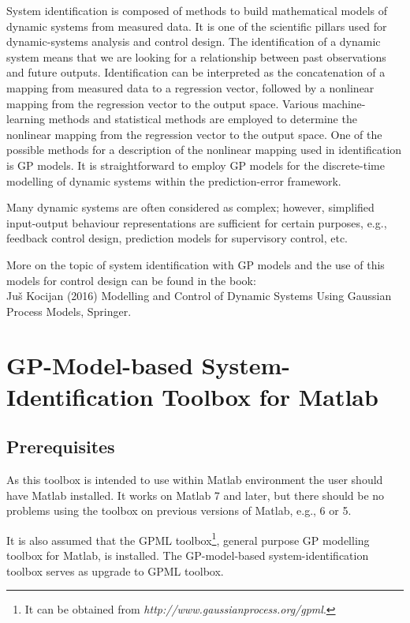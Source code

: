 \documentclass[12pt,twoside]{article}
\begin{document}
System identification is composed of methods to build mathematical models of dynamic systems from measured data. It is one of the scientific pillars used for dynamic-systems analysis and control design. The identification of a dynamic system means that we are looking for a relationship between past observations and future outputs. Identification can be interpreted as the concatenation of a mapping from measured data to a regression vector, followed by a nonlinear mapping from the regression vector to the output space. Various machine-learning methods and statistical methods are employed to determine the nonlinear mapping from the regression vector
to the output space. One of the possible methods for a description of the nonlinear mapping used in identification is GP models. It is straightforward to employ GP models for the discrete-time modelling of dynamic systems within the prediction-error framework.

Many dynamic systems are often considered as complex; however, simplified
input-output behaviour representations are sufficient for certain purposes,
e.g., feedback control design, prediction models for supervisory control,
etc.

More on the topic of system identification with GP models and the use of this models for control design can be found in the book:\\
Ju\v s Kocijan (2016) Modelling and Control of Dynamic Systems Using Gaussian
Process Models, Springer.


\section{GP-Model-based System-Identification Toolbox for Matlab}

\subsection{Prerequisites}

As this toolbox is intended to use within Matlab environment the
user should have Matlab installed. It works on Matlab 7 and later,
but there should be no problems using the toolbox on previous
versions of Matlab, e.g., 6 or 5.

It is also assumed that the GPML toolbox\footnote{It can be
obtained from \emph{http://www.gaussianprocess.org/gpml}.},
general purpose GP modelling toolbox for Matlab, is installed. The GP-model-based system-identification toolbox serves as upgrade to GPML toolbox.
\end{document}
